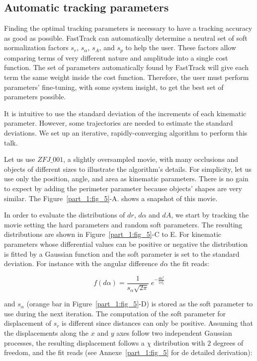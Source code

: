         \subsection{Automatic tracking parameters}
        Finding the optimal tracking parameters is necessary to have a tracking accuracy as good as possible. FastTrack can automatically determine a neutral set of soft normalization factors $s_r$, $s_\alpha$, $s_A$, and $s_p$ to help the user. These factors allow comparing terms of very different nature and amplitude into a single cost function. The set of parameters automatically found by FastTrack will give each term the same weight inside the cost function. Therefore, the user must perform parameters' fine-tuning, with some system insight, to get the best set of parameters possible.

        It is intuitive to use the standard deviation of the increments of each kinematic parameter. However, some trajectories are needed to estimate the standard deviations. We set up an iterative, rapidly-converging algorithm to perform this talk.

        Let us use $ZFJ\_001$, a slightly oversampled movie, with many occlusions and objects of different sizes to illustrate the algorithm's details. For simplicity, let us use only the position, angle, and area as kinematic parameters. There is no gain to expect by adding the perimeter parameter because objects' shapes are very similar. The Figure~\ref{part_1:fig_5}-A. shows a snapshot of this movie.

        In order to evaluate the distributions of $dr$, $d\alpha$ and $dA$, we start by tracking the movie setting the hard parameters and random soft parameters. The resulting distributions are shown in Figure~\ref{part_1:fig_5}-C to E. For kinematic parameters whose differential values can be positive or negative the distribution is fitted by a Gaussian function and the soft parameter is set to the standard deviation. For instance with the angular difference $d\alpha$ the fit reads:

        \begin{equation}
        f(d\alpha) = \frac{1}{s_\alpha\sqrt{2 \pi}} \; e^{-\frac{d\alpha^2}{2 s_\alpha^2}}
        \label{eq:fit_Gaussian}
        \end{equation}

        and $s_\alpha$ (orange bar in Figure~\ref{part_1:fig_5}-D) is stored as the soft parameter to use during the next iteration.
        The computation of the soft parameter for displacement of $s_r$ is different since distances can only be positive. Assuming that the displacements along the $x$ and $y$ axes follow two independent Gaussian processes, the resulting displacement follows a $\chi$ distribution with $2$ degrees of freedom, and the fit reads (see Annexe~\ref{part_1:fig_5} for de detailed derivation):

